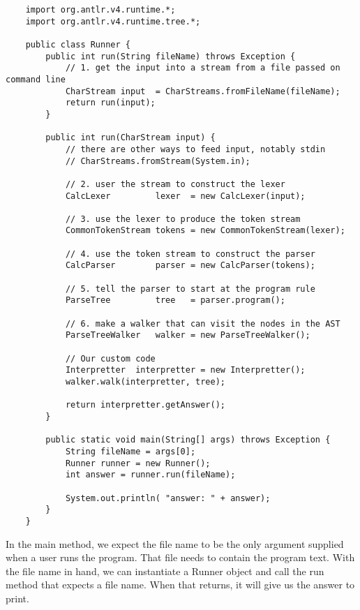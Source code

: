 {\footnotesize
\begin{verbatim}
    import org.antlr.v4.runtime.*;
    import org.antlr.v4.runtime.tree.*;
    
    public class Runner {
        public int run(String fileName) throws Exception {
            // 1. get the input into a stream from a file passed on command line
            CharStream input  = CharStreams.fromFileName(fileName);
            return run(input);
        }
    
        public int run(CharStream input) {
            // there are other ways to feed input, notably stdin
            // CharStreams.fromStream(System.in);
    
            // 2. user the stream to construct the lexer
            CalcLexer         lexer  = new CalcLexer(input);
    
            // 3. use the lexer to produce the token stream
            CommonTokenStream tokens = new CommonTokenStream(lexer);
    
            // 4. use the token stream to construct the parser
            CalcParser        parser = new CalcParser(tokens);
    
            // 5. tell the parser to start at the program rule
            ParseTree         tree   = parser.program();
    
            // 6. make a walker that can visit the nodes in the AST
            ParseTreeWalker   walker = new ParseTreeWalker();
    
            // Our custom code
            Interpretter  interpretter = new Interpretter();
            walker.walk(interpretter, tree);
    
            return interpretter.getAnswer();
        }
    
        public static void main(String[] args) throws Exception {
            String fileName = args[0];
            Runner runner = new Runner();
            int answer = runner.run(fileName);
    
            System.out.println( "answer: " + answer);
        }
    }
\end{verbatim}
}

In the main method, we expect the file name to be the only argument
supplied when a user runs the program. That file needs to contain
the program text. With the file name in hand, we can instantiate
a Runner object and call the run method that expects a file name.
When that returns, it will give us the answer to print.

